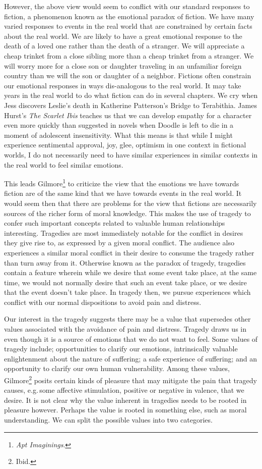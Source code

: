 \documentclass[phdthesis,12pt,final,a4paper]{wuthesis}
\theoremstyle{definition}
\theoremstyle{definition}
\theoremstyle{definition}
\theoremstyle{definition}
\theoremstyle{remark}
\begin{document}
However, the above view would seem to conflict with our standard responses to fiction, a phenomenon known as the emotional paradox of fiction. We have many varied responses to events in the real world that are constrained by certain facts about the real world. We are likely to have a great emotional response to the death of a loved one rather than the death of a stranger. We will appreciate a cheap trinket from a close sibling more than a cheap trinket from a stranger. We will worry more for a close son or daughter traveling in an unfamiliar foreign country than we will the son or daughter of a neighbor. Fictions often constrain our emotional responses in ways dis-analogous to the real world. It may take years in the real world to do what fiction can do in several chapters. We cry when Jess discovers Leslie's death in Katherine Patterson's Bridge to Terabithia. James Hurst's \emph{The Scarlet Ibis} teaches us that we can develop empathy for a character even more quickly than suggested in novels when Doodle is left to die in a moment of adolescent insensitivity. What this means is that while I might experience sentimental approval, joy, glee, optimism in one context in fictional worlds, I do not necessarily need to have similar experiences in similar contexts in the real world to feel similar emotions.

This leads Gilmore\footnote{\emph{Apt {Imaginings}}.} to criticize the view that the emotions we have towards fiction are of the same kind that we have towards events in the real world. It would seem then that there are problems for the view that fictions are necessarily sources of the richer form of moral knowledge. This makes the use of tragedy to confer such important concepts related to valuable human relationships interesting. Tragedies are most immediately notable for the conflict in desires they give rise to, as expressed by a given moral conflict. The audience also experiences a similar moral conflict in their desire to consume the tragedy rather than turn away from it. Otherwise known as the paradox of tragedy, tragedies contain a feature wherein while we desire that some event take place, at the same time, we would not normally desire that such an event take place, or we desire that the event doesn't take place. In tragedy then, we pursue experiences which conflict with our normal dispositions to avoid pain and distress.

Our interest in the tragedy suggests there may be a value that supersedes other values associated with the avoidance of pain and distress. Tragedy draws us in even though it is a source of emotions that we do not want to feel. Some values of tragedy include; opportunities to clarify our emotions, intrinsically valuable enlightenment about the nature of suffering; a safe experience of suffering; and an opportunity to clarify our own human vulnerability. Among these values, Gilmore\footnote{Ibid.} posits certain kinds of pleasure that may mitigate the pain that tragedy causes, e.g.\,some affective stimulation, positive or negative in valence, that we desire. It is not clear why the value inherent in tragedies needs to be rooted in pleasure however. Perhaps the value is rooted in something else, such as moral understanding. We can split the possible values into two categories.
\end{document}

